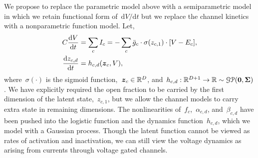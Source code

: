 \documentclass[aos]{imsart} %
\begin{document}
We propose to replace the parametric model above with a semiparametric model in which we retain functional form of~${\mathrm{d}V / \mathrm{d}t}$ but we replace the channel kinetics with a nonparametric function model. Let, 
\begin{align}
C \frac{\mathrm{d} V}{\mathrm{d} t} &= \sum_{c} I_c = -\sum_{c} \bar{g}_c \cdot \sigma(z_{c,1}) \cdot [V-E_c], \\
\nonumber 
\frac{\mathrm{d} z_{c,d}}{\mathrm{d} t} &= h_{c,d}( \bz_c, V),
\end{align}
where~$\sigma(\cdot)$ is the sigmoid function,~${\boldsymbol{z}_c \in \mathbb{R}^D}$, and~${h_{c,d}: \mathbb{R}^{D+1} \to \mathbb{R} \sim \mathcal{GP}(\boldsymbol{0}, \boldsymbol{\Sigma})}$. We have explicitly required the open fraction to be carried by the first dimension of the latent state,~$z_{c,1}$, but we allow the channel models to carry extra state in remaining dimensions. The nonlinearities of~$f_c$,~$\alpha_{c,d}$, and~$\beta_{c,d}$ have been pushed into the logistic function and the dynamics function~$h_{c,d}$, which we model with a Gaussian process. Though the latent function cannot be viewed as rates of activation and inactivation, we can still view the voltage dynamics as arising from currents through voltage gated channels.
\end{document}
